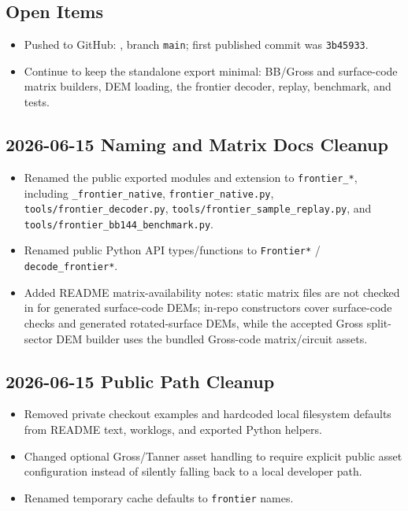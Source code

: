 \subsection*{Open Items}

\begin{itemize}
\item Pushed to GitHub: \texttt{}, branch \texttt{main}; first published commit was \texttt{3b45933}.
\item Continue to keep the standalone export minimal: BB/Gross and surface-code matrix builders, DEM loading, the frontier decoder, replay, benchmark, and tests.
\end{itemize}

\subsection*{2026-06-15 Naming and Matrix Docs Cleanup}

\begin{itemize}
\item Renamed the public exported modules and extension to \texttt{frontier\_*}, including \texttt{\_frontier\_native}, \texttt{frontier\_native.py}, \texttt{tools/frontier\_decoder.py}, \texttt{tools/frontier\_sample\_replay.py}, and \texttt{tools/frontier\_bb144\_benchmark.py}.
\item Renamed public Python API types/functions to \texttt{Frontier*} / \texttt{decode\_frontier*}.
\item Added README matrix-availability notes: static matrix files are not checked in for generated surface-code DEMs; in-repo constructors cover surface-code checks and generated rotated-surface DEMs, while the accepted Gross split-sector DEM builder uses the bundled Gross-code matrix/circuit assets.
\end{itemize}

\subsection*{2026-06-15 Public Path Cleanup}

\begin{itemize}
\item Removed private checkout examples and hardcoded local filesystem defaults from README text, worklogs, and exported Python helpers.
\item Changed optional Gross/Tanner asset handling to require explicit public asset configuration instead of silently falling back to a local developer path.
\item Renamed temporary cache defaults to \texttt{frontier} names.
\end{itemize}

